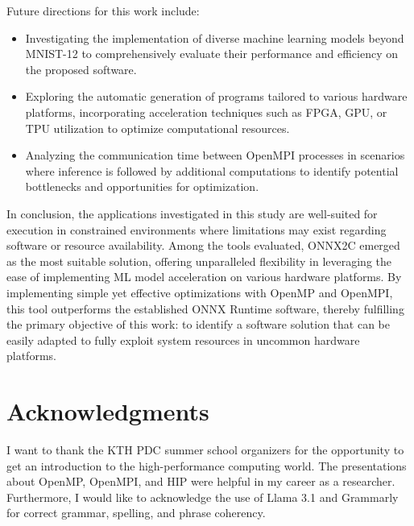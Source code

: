 \documentclass[fleqn,10pt]{olplainarticle}
\begin{document}
Future directions for this work include:
\begin{itemize}
    \item Investigating the implementation of diverse machine learning models beyond MNIST-12 to comprehensively evaluate their performance and efficiency on the proposed software.
    \item Exploring the automatic generation of programs tailored to various hardware platforms, incorporating acceleration techniques such as FPGA, GPU, or TPU utilization to optimize computational resources.
    \item Analyzing the communication time between OpenMPI processes in scenarios where inference is followed by additional computations to identify potential bottlenecks and opportunities for optimization.
\end{itemize}

In conclusion, the applications investigated in this study are well-suited for execution in constrained environments where limitations may exist regarding software or resource availability. Among the tools evaluated, ONNX2C emerged as the most suitable solution, offering unparalleled flexibility in leveraging the ease of implementing ML model acceleration on various hardware platforms. By implementing simple yet effective optimizations with OpenMP and OpenMPI, this tool outperforms the established ONNX Runtime software, thereby fulfilling the primary objective of this work: to identify a software solution that can be easily adapted to fully exploit system resources in uncommon hardware platforms.

\section*{Acknowledgments}
I want to thank the KTH PDC summer school organizers for the opportunity to get an introduction to the high-performance computing world. The presentations about OpenMP, OpenMPI, and HIP were helpful in my career as a researcher. Furthermore, I would like to acknowledge the use of Llama 3.1 and Grammarly for correct grammar, spelling, and phrase coherency.


\end{document}
